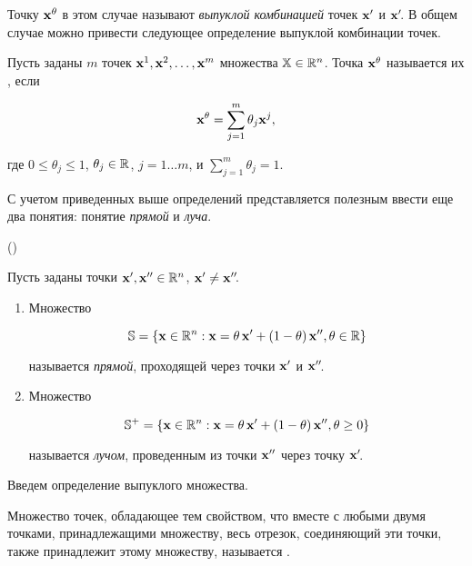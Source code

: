 Точку $\mathbf{x}^\theta$ в этом случае называют \emph{выпуклой
комбинацией} точек $\mathbf{x}'$ и $\mathbf{x}'\!$. В общем случае можно
привести следующее определение выпуклой комбинации точек.

\begin{dfn}

Пусть заданы $m$ точек $\mathbf{x}^1, \mathbf{x}^2, \ldots, \mathbf{x}^m$
множества ${\mathbb{X} \in \mathbb{R}^n}$. Точка $\mathbf{x}^\theta$ называется их
, если

\[
\mathbf{x}^\theta = \sum \limits_{j=1}^{m} \theta_j \mathbf{x}^j,
\]

\noindent где $0 \leq \theta_j \leq 1$, $\theta_j \in \mathbb{R}$, $j=1
\ldots m$, и $\sum \limits _{j=1}^{m} \theta_j=1$. \end{dfn}

С учетом приведенных выше определений представляется полезным ввести
еще два понятия: понятие \emph{прямой} и \emph{луча}.

\begin{dfn}(\cite{Kapustin:2001})

Пусть заданы точки $\mathbf{x}', \mathbf{x}'' \in \mathbb{R}^n$, $\mathbf{x}' \neq
\mathbf{x}''\!$.

\begin{enumerate}
\renewcommand{\theenumi}{(\asbuk{enumi})}

  \item Множество

  \[
  \mathbb{S}= \{ \mathbf{x}\in \mathbb{R}^n: \mathbf{x} = \theta \, \mathbf{x}' +
(1-\theta) \, \mathbf{x}'', \theta \in \mathbb{R} \}
    \]

\noindent называется \emph{прямой}, проходящей через
точки $\mathbf{x}'$ и $\mathbf{x}''\!$.

  \item Множество


\[
  \mathbb{S^+}= \{ \mathbf{x}\in \mathbb{R}^n: \mathbf{x} = \theta \, \mathbf{x}' +
(1-\theta) \, \mathbf{x}'', \theta \geq 0 \}
    \]

\noindent называется \emph{лучом}, проведенным из точки
$\mathbf{x}''$ через точку $\mathbf{x}'\!$.

\end{enumerate}

\end{dfn}

Введем определение выпуклого множества.


\begin{dfn}

Множество точек, обладающее тем свойством, что вместе с любыми двумя
точками, принадлежащими множеству, весь отрезок, соединяющий эти
точки, также принадлежит этому множеству, называется .
\end{dfn}

